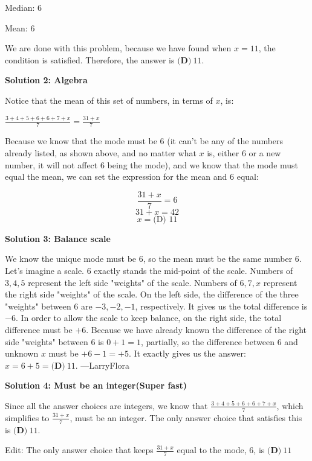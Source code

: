 \begin{enumerate}
 Median: $6$

 Mean: $6$

 We are done with this problem, because we have found when $x = 11$, the condition is satisfied. Therefore, the answer is $\boxed{{\textbf{(D)}\ 11}}$.

 



\textbf{Solution 2: Algebra}

Notice that the mean of this set of numbers, in terms of $x$, is:

 $\frac{3+4+5+6+6+7+x}{7} = \frac{31+x}{7}$

 Because we know that the mode must be $6$ (it can't be any of the numbers already listed, as shown above, and no matter what $x$ is, either $6$ or a new number,  it will not affect $6$ being the mode), and we know that the mode must equal the mean, we can set the expression for the mean and $6$ equal:

 
 \[\dfrac{31+x}{7}=6\]
 \[31+x=42\]
 \[x=\boxed{\text{(D) } 11}\]




\textbf{Solution 3: Balance scale}

We know the unique mode must be $6$, so the mean must be the same number $6$. Let's imagine a scale. $6$ exactly stands the mid-point of the scale. Numbers of $3,4,5$ represent the left side "weights" of the scale. Numbers of $6,7, x$ represent the right side "weights" of the scale. On the left side, the difference of the three "weights" between $6$ are $-3, -2, -1$, respectively. It gives us the total difference is $-6$. In order to allow the scale to keep balance, on the right side, the total difference must be $+6$. Because we have already known the difference of the right side "weights" between $6$ is $0+1=1$, partially, so the difference between $6$ and unknown $x$ must be $+6-1=+5$. It exactly gives us the answer:$x=6+5= \boxed{{\textbf{(D)}\ 11}}$. ---LarryFlora

 


 



\textbf{Solution 4: Must be an integer(Super fast)}

Since all the answer choices are integers, we know that $\frac{3+4+5+6+6+7+x}{7}$, which simplifies to $\frac{31+x}{7}$, must be an integer. The only answer choice that satisfies this is $\boxed{{\textbf{(D)}\ 11}}$.

 Edit: The only answer choice that keeps $\frac{31+x}{7}$ equal to the mode, 6, is $\boxed{{\textbf{(D)}\ 11}}$




\end{enumerate}
